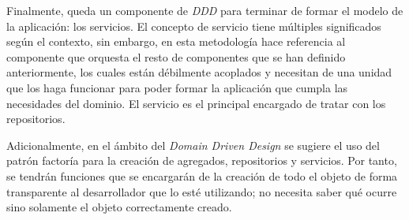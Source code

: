 Finalmente, queda un componente de \textit{DDD} para terminar de formar el
modelo de la aplicación: los servicios. El concepto de servicio tiene múltiples
significados según el contexto, sin embargo, en esta metodología hace referencia
al componente que orquesta el resto de componentes que se han definido
anteriormente, los cuales están débilmente acoplados y necesitan de una unidad
que los haga funcionar para poder formar la aplicación que cumpla las
necesidades del dominio. El servicio es el principal encargado de tratar con los
repositorios.

Adicionalmente, en el ámbito del \textit{Domain Driven Design} se sugiere el uso
del patrón factoría para la creación de agregados, repositorios y servicios. Por
tanto, se tendrán funciones que se encargarán de la creación de todo el objeto
de forma transparente al desarrollador que lo esté utilizando; no necesita saber
qué ocurre sino solamente el objeto correctamente creado.

